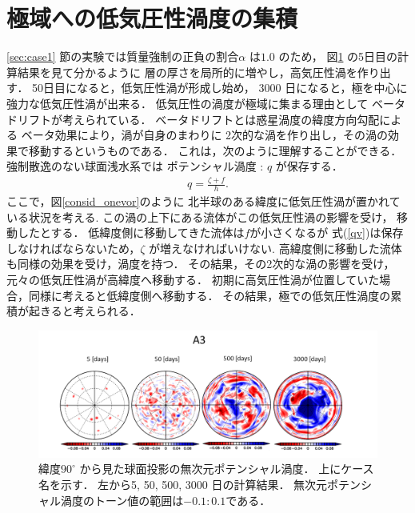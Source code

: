 \documentclass[a4j,12pt,openbib,oneside]{jreport}
\begin{document}
\section{極域への低気圧性渦度の集積}
\label{sec:considpolar}
\ref{sec:case1} 節の実験では質量強制の正負の割合$\alpha$ は$1.0$ のため，
図\ref{fig:consid_nonqv_a3} の5日目の計算結果を見て分かるように
層の厚さを局所的に増やし，高気圧性渦を作り出す．
50日目になると，低気圧性渦が形成し始め，
3000 日になると，極を中心に強力な低気圧性渦が出来る．
%
低気圧性の渦度が極域に集まる理由として
ベータドリフトが考えられている．
%
ベータドリフトとは惑星渦度の緯度方向勾配による
ベータ効果により，渦が自身のまわりに
2次的な渦を作り出し，その渦の効果で移動するというものである．
これは，次のように理解することができる．
強制散逸のない球面浅水系では
ポテンシャル渦度 : $q$ が保存する．
\begin{align}
q = \frac{\zeta + f}{h}. \label{qv}
\end{align}
ここで，図\ref{consid_onevor}のように
北半球のある緯度に低気圧性渦が置かれている状況を考える.
この渦の上下にある流体がこの低気圧性渦の影響を受け，
移動したとする．
低緯度側に移動してきた流体は$f$が小さくなるが
式(\ref{qv})は保存しなければならないため，$\zeta$ が増えなければいけない.
高緯度側に移動した流体も同様の効果を受け，渦度を持つ．
その結果，その2次的な渦の影響を受け，
元々の低気圧性渦が高緯度へ移動する．
初期に高気圧性渦が位置していた場合，同様に考えると低緯度側へ移動する．
その結果，極での低気圧性渦度の累積が起きると考えられる．
\begin{figure}[ht]
  \begin{center}
    \includegraphics[clip,width=14cm]{./fig/consideration/nonqv_a3.png}
    \caption{
      \footnotesize{緯度$90^\circ$ から見た球面投影の無次元ポテンシャル渦度．
上にケース名を示す．
左から5, 50, 500, 3000 日の計算結果．
無次元ポテンシャル渦度のトーン値の範囲は$-0.1:0.1$である．
      }
    }
    \label{fig:consid_nonqv_a3}
  \end{center}
\end{figure}
%
\end{document}
